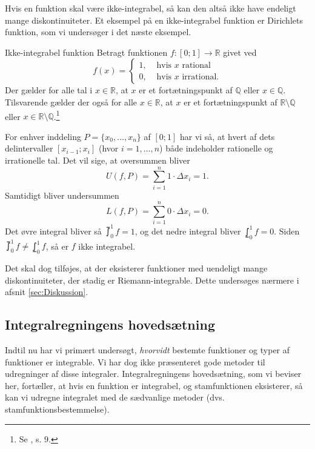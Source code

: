 Hvis en funktion skal være ikke-integrabel, så kan den altså ikke have endeligt mange diskontinuiteter.
Et eksempel på en ikke-integrabel funktion er Dirichlets funktion, som vi undersøger i det næste eksempel.

\begin{example}[label=exa:ikke-integrabel]{Ikke-integrabel funktion}{}
  Betragt funktionen $f:[0;1] \to \mathbb{R}$ givet ved
  \[
  f(x)= 
  \begin{cases}
    1, &\text{ hvis } x \text{ rational }\\
    0, &\text{ hvis } x \text{ irrational.}
  \end{cases}
  \] 
Der gælder for alle tal i $x \in \mathbb{R}$, at $x$ er et fortætningspunkt af $\mathbb{Q}$ eller $x \in \mathbb{Q}$. 
  Tilsvarende gælder der også for alle $x \in \mathbb{R}$, at $x$ er et fortætningspunkt af $\mathbb{R} \setminus \mathbb{Q}$ eller $x \in \mathbb{R} \setminus \mathbb{Q}$.\footnote{Se \cite{Rudin1976}, s. 9.}

  For enhver inddeling $P=\{ x_0, \ldots , x_n \}$ af $[0;1]$ har vi så, at hvert af dets delintervaller $[x _{i-1};x_i]$ (hvor $i=1,\ldots , n$) både indeholder rationelle og irrationelle tal. 
  Det vil sige, at oversummen bliver
  \[
  U(f, P)=\sum_{i  =1}^{n} 1 \cdot \Delta x_i =1. 
  \] 
  Samtidigt bliver undersummen
\[
  L(f ,P)=\sum_{i =1}^{n} 0 \cdot \Delta x_i =0.
\] 
  Det øvre integral bliver så $\upint_{0}^{1} f =1$, og det nedre integral bliver $\lowint_{0}^{1} f =0 $.
  Siden $\upint_{0}^{1} f \neq \lowint_{0}^{1} f$, så er $f$ ikke integrabel. 
\end{example}

Det skal dog tilføjes, at der eksisterer funktioner med uendeligt mange diskontinuiteter, der stadig er Riemann-integrable.
Dette undersøges nærmere i afsnit \ref{sec:Diskussion}.

\subsection{Integralregningens hovedsætning}%
\label{sub:Integralregningens hovedsætning}
Indtil nu har vi primært undersøgt, \textit{hvorvidt} bestemte funktioner og typer af funktioner er integrable.
Vi har dog ikke præsenteret gode metoder til udregninger af disse integraler.
Integralregningens hovedsætning, som vi beviser her, fortæller, at hvis en funktion er integrabel, og stamfunktionen eksisterer, så kan vi udregne integralet med de sædvanlige metoder (dvs. stamfunktionsbestemmelse).


